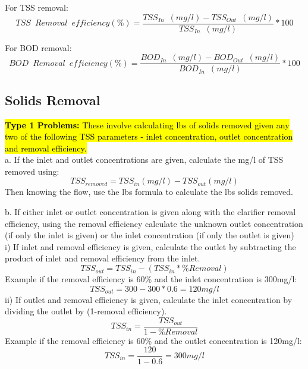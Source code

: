 For TSS removal:\\
$$TSS \enspace Removal \enspace efficiency (\%) = \dfrac{TSS  _{In} \enspace(mg/l)  - TSS_{Out} \enspace(mg/l)  }{TSS _{In} \enspace(mg/l)  } * 100$$

For BOD removal:\\
$$BOD \enspace Removal \enspace efficiency (\%) = \dfrac{BOD_{In} \enspace(mg/l)  - BOD_{Out} \enspace(mg/l)  }{BOD _{In} \enspace(mg/l)  } * 100$$
\subsection{Solids Removal}	

\hl{\textbf{Type 1 Problems:}  These involve calculating lbs of solids removed given any two of the following TSS parameters - inlet concentration, outlet concentration and removal efficiency.}\\
a. If the inlet and outlet concentrations are given, calculate the mg/l of TSS removed using: 
$$TSS_{removed} = TSS_{in}(mg/l) - TSS_{out} (mg/l) $$
Then knowing the flow, use the lbs formula to calculate the lbs solids removed.

b. If either inlet or outlet concentration is given along with the clarifier removal efficiency, using the removal efficiency calculate the unknown outlet concentration (if only the inlet is given) or the inlet concentration (if only the outlet is given)\\
i) If inlet and removal efficiency is given, calculate the outlet by subtracting the product of inlet and removal efficiency from the inlet.
$$TSS_{out}=TSS_{in} - (TSS_{in}*\%Removal)$$
Example if the removal efficiency is 60\% and the inlet concentration is 300mg/l: $$TSS_{out}=300 - 300*0.6=120mg/l$$
ii) If outlet and removal efficiency is given, calculate the inlet concentration by dividing the outlet by (1-removal efficiency).\\
$$TSS_{in}=\dfrac{TSS_{out}}{1-\%Removal}$$
Example if the removal efficiency is 60\% and the outlet concentration is 120mg/l: $$TSS_{in}=\dfrac{120}{1-0.6}=300mg/l$$ 

